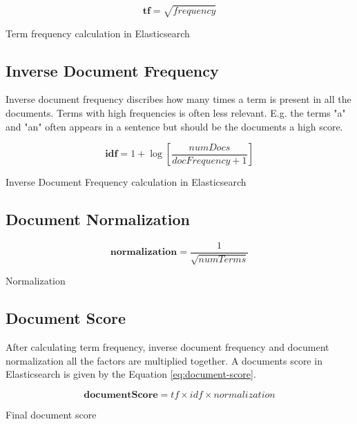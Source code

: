 \begin{cequation}[H]
	\begin{equation}
		\mathbf{tf} = \sqrt{frequency}
	\end{equation}
	\caption{Term frequency calculation in Elasticsearch}
  \label{eq:term-frequency}
\end{cequation}

\subsection{Inverse Document Frequency}
Inverse document frequency discribes how many times a term is present in all the documents.
Terms with high frequencies is often less relevant.
E.g. the terms "a" and "an" often appears in a sentence but should be the documents a high score.


\begin{cequation}[H]
	\begin{equation}
		\mathbf{idf} = 1 + \log{[\frac{numDocs}{docFrequency + 1}]}
	\end{equation}
	\caption{Inverse Document Frequency calculation in Elasticsearch}
  \label{eq:idf}
\end{cequation}

\subsection{Document Normalization}

\begin{cequation}[H]
	\begin{equation}
		\mathbf{normalization} = \frac{1}{\sqrt{numTerms}}
	\end{equation}
	\caption{Normalization}
  \label{eq:normalization}
\end{cequation}

\subsection{Document Score}
\label{sec:doc-score}
After calculating term frequency, inverse document frequency and document normalization all the factors are multiplied together.
A documents score in Elasticsearch is given by the Equation \ref{eq:document-score}.

\begin{cequation}[H]
	\begin{equation}
		\mathbf{documentScore} = tf \times idf \times normalization
	\end{equation}
	\caption{Final document score}
  \label{eq:document-score}
\end{cequation}

